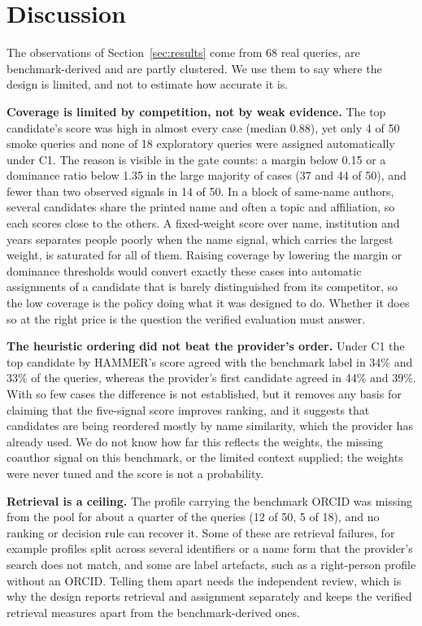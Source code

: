 \section{Discussion}
\label{sec:discussion}
The observations of Section~\ref{sec:results} come from 68 real queries, are benchmark-derived and are partly clustered. We use them to say where the design is limited, and not to estimate how accurate it is.

\textbf{Coverage is limited by competition, not by weak evidence.} The top candidate's score was high in almost every case (median 0.88), yet only 4 of 50 smoke queries and none of 18 exploratory queries were assigned automatically under C1. The reason is visible in the gate counts: a margin below 0.15 or a dominance ratio below 1.35 in the large majority of cases (37 and 44 of 50), and fewer than two observed signals in 14 of 50. In a block of same-name authors, several candidates share the printed name and often a topic and affiliation, so each scores close to the others. A fixed-weight score over name, institution and years separates people poorly when the name signal, which carries the largest weight, is saturated for all of them. Raising coverage by lowering the margin or dominance thresholds would convert exactly these cases into automatic assignments of a candidate that is barely distinguished from its competitor, so the low coverage is the policy doing what it was designed to do. Whether it does so at the right price is the question the verified evaluation must answer.

\textbf{The heuristic ordering did not beat the provider's order.} Under C1 the top candidate by HAMMER's score agreed with the benchmark label in 34\% and 33\% of the queries, whereas the provider's first candidate agreed in 44\% and 39\%. With so few cases the difference is not established, but it removes any basis for claiming that the five-signal score improves ranking, and it suggests that candidates are being reordered mostly by name similarity, which the provider has already used. We do not know how far this reflects the weights, the missing coauthor signal on this benchmark, or the limited context supplied; the weights were never tuned and the score is not a probability.

\textbf{Retrieval is a ceiling.} The profile carrying the benchmark ORCID was missing from the pool for about a quarter of the queries (12 of 50, 5 of 18), and no ranking or decision rule can recover it. Some of these are retrieval failures, for example profiles split across several identifiers or a name form that the provider's search does not match, and some are label artefacts, such as a right-person profile without an ORCID. Telling them apart needs the independent review, which is why the design reports retrieval and assignment separately and keeps the verified retrieval measures apart from the benchmark-derived ones.

